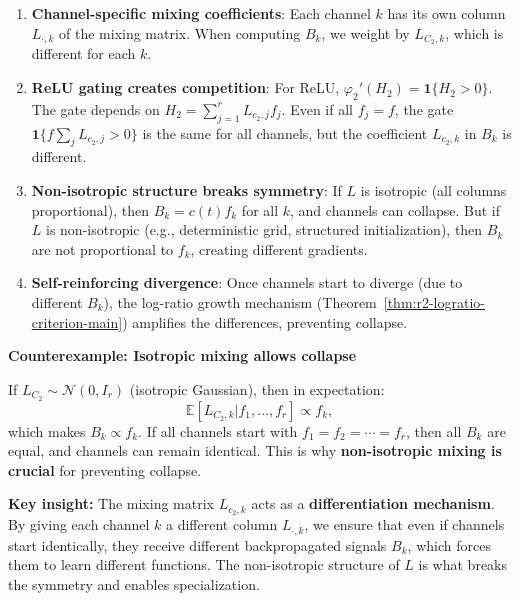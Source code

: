 \documentclass[11pt]{article}
\newcommand{\E}{\mathbb{E}}
\newcommand{\1}{\mathbbm{1}}
\begin{document}
\begin{enumerate}
\item \textbf{Channel-specific mixing coefficients}: Each channel $k$ has its own column $L_{\cdot,k}$ of the mixing matrix. When computing $B_k$, we weight by $L_{C_2,k}$, which is different for each $k$.

\item \textbf{ReLU gating creates competition}: For ReLU, $\varphi_2'(H_2) = \mathbf{1}\{H_2 > 0\}$. The gate depends on $H_2 = \sum_{j=1}^r L_{c_2,j} f_j$. Even if all $f_j = f$, the gate $\mathbf{1}\{f \sum_j L_{c_2,j} > 0\}$ is the same for all channels, but the coefficient $L_{c_2,k}$ in $B_k$ is different.

\item \textbf{Non-isotropic structure breaks symmetry}: If $L$ is isotropic (all columns proportional), then $B_k = c(t) f_k$ for all $k$, and channels can collapse. But if $L$ is non-isotropic (e.g., deterministic grid, structured initialization), then $B_k$ are not proportional to $f_k$, creating different gradients.

\item \textbf{Self-reinforcing divergence}: Once channels start to diverge (due to different $B_k$), the log-ratio growth mechanism (Theorem~\ref{thm:r2-logratio-criterion-main}) amplifies the differences, preventing collapse.
\end{enumerate}

\textbf{Counterexample: Isotropic mixing allows collapse}

If $L_{C_2} \sim \mathcal{N}(0, I_r)$ (isotropic Gaussian), then in expectation:
\[
\E[L_{C_2,k} | f_1, \ldots, f_r] \propto f_k,
\]
which makes $B_k \propto f_k$. If all channels start with $f_1 = f_2 = \cdots = f_r$, then all $B_k$ are equal, and channels can remain identical. This is why \textbf{non-isotropic mixing is crucial} for preventing collapse.

\textbf{Key insight:} The mixing matrix $L_{c_2,k}$ acts as a \textbf{differentiation mechanism}. By giving each channel $k$ a different column $L_{\cdot,k}$, we ensure that even if channels start identically, they receive different backpropagated signals $B_k$, which forces them to learn different functions. The non-isotropic structure of $L$ is what breaks the symmetry and enables specialization.
\end{document}
